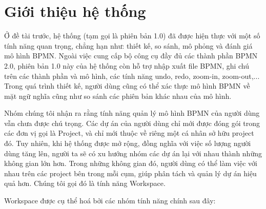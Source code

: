 \section{Giới thiệu hệ thống}
Ở đề tài trước, hệ thống (tạm gọi là phiên bản 1.0) đã được hiện thực với một số tính năng quan trọng, chẳng hạn như: thiết kế, so sánh, mô phỏng và đánh giá mô hình BPMN. Ngoài việc cung cấp bộ công cụ đầy đủ các thành phần BPMN 2.0, phiên bản 1.0 này của hệ thống còn hỗ trợ nhập xuất file BPMN, ghi chú trên các thành phần và mô hình, các tính năng undo, redo, zoom-in, zoom-out,... Trong quá trình thiết kế, người dùng cũng có thể xác thực mô hình BPMN về mặt ngữ nghĩa cũng như so sánh các phiên bản khác nhau của mô hình.
\par
Nhóm chúng tôi nhận ra rằng tính năng quản lý mô hình BPMN của người dùng vẫn chưa được chú trọng. Các dự án của người dùng chỉ mới được đóng gói trong các đơn vị gọi là Project, và chỉ mới thuộc về riêng một cá nhân sở hữu project đó. Tuy nhiên, khi hệ thống được mở rộng, đồng nghĩa với việc số lượng người dùng tăng lên, người ta sẽ có xu hướng nhóm các dự án lại với nhau thành những không gian lớn hơn. Trong những không gian đó, người dùng có thể làm việc với nhau trên các project bên trong mỗi cụm, giúp phân tách và quản lý dự án hiệu quả hơn. Chúng tôi gọi đó là tính năng Workspace.
\par
Workspace được cụ thể hoá bởi các nhóm tính năng chính sau đây:
